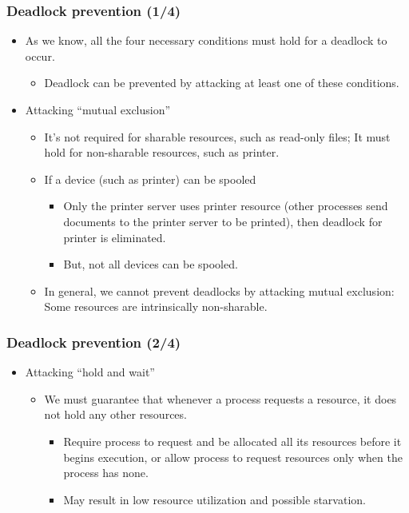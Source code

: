 \documentclass[CJKutf8,xcolor=pdftex,dvipsnames,table]{beamer}
\begin{document}
\begin{CJK*}{UTF8}{song}
  \iffalse


  \begin{frame}
  \frametitle{Deadlock prevention (1/4)} \pause
  \begin{itemize}
  \item{As we know, all the four necessary conditions must hold for a deadlock to occur.} \pause
    \begin{itemize}
    \item{Deadlock can be prevented by attacking at least one of these conditions.} \pause
    \end{itemize}
  \item{Attacking ``mutual exclusion''} \pause
    \begin{itemize}
    \item{It's not required for sharable resources, such as read-only files; \pause It must hold for non-sharable resources, such as printer.} \pause
    \item{If a device (such as printer) can be spooled} \pause
      \begin{itemize}
      \item{Only the printer server uses printer resource (other processes send documents to the printer server to be printed), then deadlock for printer is eliminated.} \pause
      \item{But, not all devices can be spooled.} \pause
      \end{itemize}
    \item{In general, we cannot prevent deadlocks by attacking mutual exclusion: Some resources are intrinsically non-sharable.}
    \end{itemize}
  \end{itemize}
  \end{frame}
  
  \begin{frame}
  \frametitle{Deadlock prevention (2/4)} \pause
  \begin{itemize}
  \item{Attacking ``hold and wait''} \pause
    \begin{itemize}
    \item{We must guarantee that whenever a process requests a resource, it does not hold any other resources.} \pause
      \begin{itemize}
      \item{Require process to request and be allocated all its resources before it begins execution, \pause or allow process to request resources only when the process has none.} \pause
      \item{May result in low resource utilization and possible starvation.}
      \end{itemize}
    \end{itemize}
  \end{itemize}
  \end{frame}
  

\end{CJK*}
\end{document}
